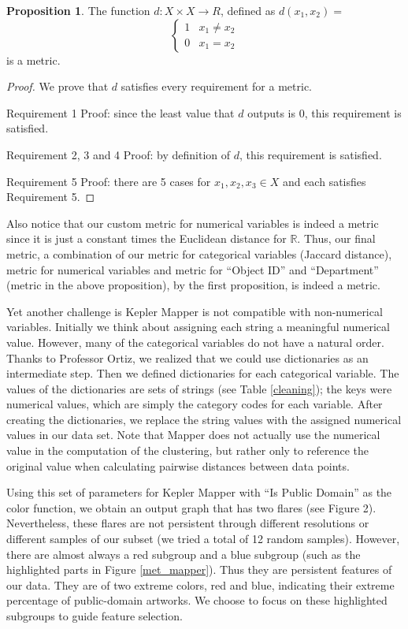 \documentclass[12pt]{article}
\theoremstyle{definition}
\newtheorem*{proposition}{Proposition}
\newcommand{\RR}{\mathbb{R}}
\begin{document}
\begin{proposition}
The function $d: X \times X \rightarrow R$, defined as $d(x_1, x_2)=$
\[ \begin{cases} 
      1 & x_1 \neq x_2 \\
      0 & x_1 = x_2
   \end{cases}
\]
is a metric.
\end{proposition}
\begin{proof}
We prove that $d$ satisfies every requirement for a metric.

Requirement 1 Proof: since the least value that $d$ outputs is $0$, this requirement is satisfied.

Requirement 2, 3 and 4 Proof: by definition of $d$, this requirement is satisfied.

Requirement 5 Proof: there are 5 cases for $x_1, x_2, x_3 \in X$ and each satisfies Requirement 5. 
\end{proof}
Also notice that our custom metric for numerical variables is indeed a metric since it is just a constant times the Euclidean distance for $\RR$. Thus, our final metric, a combination of our metric for categorical variables (Jaccard distance), metric for numerical variables and metric for ``Object ID'' and ``Department'' (metric in the above proposition), by the first proposition, is indeed a metric.
\newline
\par Yet another challenge is Kepler Mapper is not compatible with non-numerical variables. Initially we think about assigning each string a meaningful numerical value. However, many of the categorical variables do not have a natural order. Thanks to Professor Ortiz, we realized that we could use dictionaries as an intermediate step. Then we defined dictionaries for each categorical variable. The values of the dictionaries are sets of strings (see Table \ref{cleaning}); the keys were numerical values, which are simply the category codes for each variable. After creating the dictionaries, we replace the string values with the assigned numerical values in our data set. Note that Mapper does not actually use the numerical value in the computation of the clustering, but rather only to reference the original value when calculating pairwise distances between data points. 
\par Using this set of parameters for Kepler Mapper with ``Is Public Domain'' as the color function, we obtain an output graph that has two flares (see Figure 2). Nevertheless, these flares are not persistent through different resolutions or different samples of our subset (we tried a total of 12 random samples). However, there are almost always a red subgroup and a blue subgroup (such as the highlighted parts in Figure \ref{met_mapper}). Thus they are persistent features of our data. They are of two extreme colors, red and blue, indicating their extreme percentage of public-domain artworks. We  choose to focus on these highlighted subgroups to guide feature selection.
\end{document}
